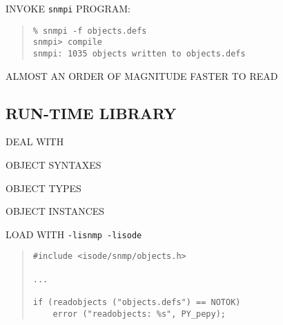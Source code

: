 \begin{bwslide}

\begin{nrtc}
\item	INVOKE \verb"snmpi" PROGRAM:
\begin{quote}\small\begin{verbatim}
% snmpi -f objects.defs
snmpi> compile
snmpi: 1035 objects written to objects.defs
\end{verbatim}\end{quote}

\item	ALMOST AN ORDER OF MAGNITUDE FASTER TO READ
\end{nrtc}
\end{bwslide}


\begin{bwslide}
\part*	{RUN-TIME LIBRARY}\bf

\begin{nrtc}
\item	DEAL WITH
    \begin{nrtc}
    \item	OBJECT SYNTAXES

    \item	OBJECT TYPES

    \item	OBJECT INSTANCES
    \end{nrtc}

\item	LOAD WITH \verb"-lisnmp -lisode"
\end{nrtc}
\end{bwslide}


\begin{bwslide}

\begin{quote}\small\begin{verbatim}
#include <isode/snmp/objects.h>

...

if (readobjects ("objects.defs") == NOTOK)
    error ("readobjects: %s", PY_pepy);
\end{verbatim}\end{quote}
\end{bwslide}


